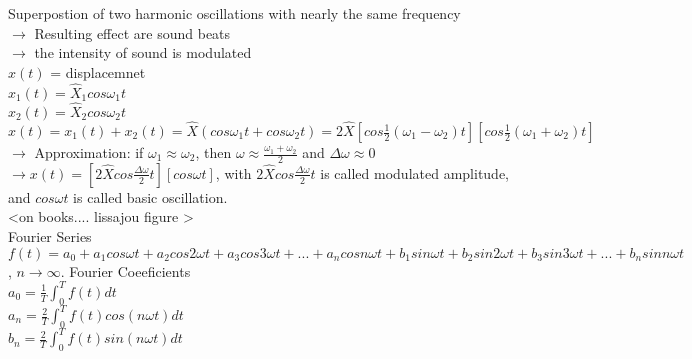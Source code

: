 \documentclass[a4paper,12pt,oneside]{report}
\begin{document}
Superpostion of two harmonic oscillations with nearly the same frequency\\
$\rightarrow$ Resulting effect are sound beats \\
$\rightarrow$ the intensity of sound is modulated \\
$x(t)$ = displacemnet\\
$x_{1}(t)=\hat{X}_{1}cos\omega_{1}t$\\
$x_{2}(t)=\hat{X}_{2}cos\omega_{2}t$\\
$x(t)=x_{1}(t)+x_{2}(t)=\hat{X}(cos\omega_{1}t+cos\omega_{2}t)=2\hat{X}\left[cos\frac{1}{2}(\omega_{1}-\omega_{2})t\right]\left[cos\frac{1}{2}(\omega_{1}+\omega_{2})t\right]$\\
$\rightarrow$ Approximation: if $\omega_{1}\approx\omega_{2}$, then $\omega\approx\frac{\omega_{1}+\omega_{2}}{2}$ and $\Delta\omega\approx 0$\\
$\rightarrow x(t)=\displaystyle\left[2\hat{X}cos\frac{\Delta\omega}{2}t\right]\left[cos\omega t\right]$, with $2\hat{X}cos\frac{\Delta\omega}{2}t$ is called modulated amplitude, and $cos\omega t$ is called basic oscillation.\\
<on books.... lissajou figure >\\
Fourier Series\\
$f(t)=a_{0}+a_{1}cos\omega t+a_{2}cos2\omega t+a_{3}cos3\omega t+...+a_{n}cosn\omega t + b_{1}sin\omega t+b_{2}sin2\omega t+b_{3}sin3\omega t+...+b_{n}sin n\omega t$, $n\rightarrow \infty$.
Fourier Coeeficients\\
$\displaystyle a_{0}=\frac{1}{T}\int_{0}^{T}{f(t)dt}$\\
$\displaystyle a_{n}=\frac{2}{T}\int_{0}^{T}{f(t)cos(n\omega t)dt}$\\
$\displaystyle b_{n}=\frac{2}{T}\int_{0}^{T}{f(t)sin(n\omega t)dt}$\\
\end{document}
